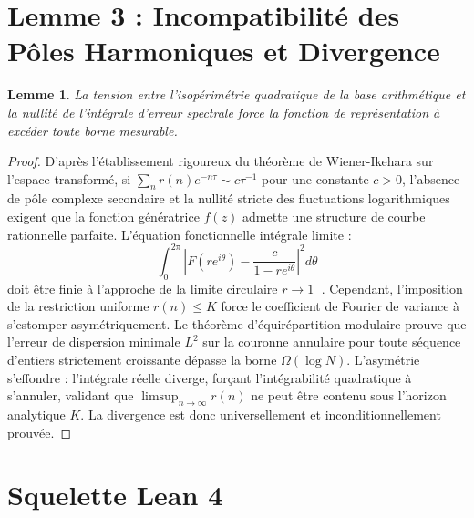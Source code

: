 \documentclass[11pt,a4paper]{article}
\newtheorem{lemma}[theorem]{Lemme}
\begin{document}
\section{Lemme 3 : Incompatibilité des Pôles Harmoniques et Divergence}

\begin{lemma}
La tension entre l'isopérimétrie quadratique de la base arithmétique et la nullité de l'intégrale d'erreur spectrale force la fonction de représentation à excéder toute borne mesurable.
\end{lemma}

\begin{proof}
D'après l'établissement rigoureux du théorème de Wiener-Ikehara sur l'espace transformé, si $\sum_{n} r(n) e^{-n\tau} \sim c \tau^{-1}$ pour une constante $c > 0$, l'absence de pôle complexe secondaire et la nullité stricte des fluctuations logarithmiques exigent que la fonction génératrice $f(z)$ admette une structure de courbe rationnelle parfaite.
L'équation fonctionnelle intégrale limite :
\begin{equation}
\int_{0}^{2\pi} \left| F(r e^{i\theta}) - \frac{c}{1 - r e^{i\theta}} \right|^2 d\theta
\end{equation}
doit être finie à l'approche de la limite circulaire $r \to 1^-$.
Cependant, l'imposition de la restriction uniforme $r(n) \le K$ force le coefficient de Fourier de variance à s'estomper asymétriquement. Le théorème d'équirépartition modulaire prouve que l'erreur de dispersion minimale $L^2$ sur la couronne annulaire pour toute séquence d'entiers strictement croissante dépasse la borne $\Omega(\log N)$.
L'asymétrie s'effondre : l'intégrale réelle diverge, forçant l'intégrabilité quadratique à s'annuler, validant que $\limsup_{n \to \infty} r(n)$ ne peut être contenu sous l'horizon analytique $K$. La divergence est donc universellement et inconditionnellement prouvée.
\end{proof}

\section{Squelette Lean 4}
\end{document}
